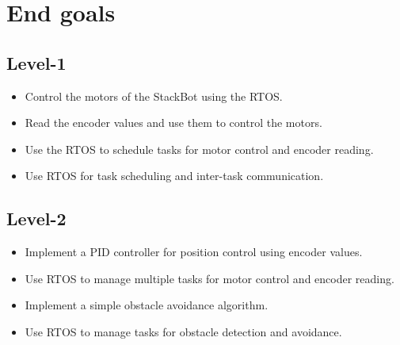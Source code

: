 \section*{End goals}

\subsection*{Level-1}

\begin{itemize}[noitemsep]
    \item Control the motors of the StackBot using the RTOS.\@
    \item Read the encoder values and use them to control the motors.
    \item Use the RTOS to schedule tasks for motor control and encoder reading.
    \item Use RTOS for task scheduling and inter-task communication.
\end{itemize}

\subsection*{Level-2}

\begin{itemize}[noitemsep]
    \item Implement a PID controller for position control using encoder values.
    \item Use RTOS to manage multiple tasks for motor control and encoder reading.
    \item Implement a simple obstacle avoidance algorithm.
    \item Use RTOS to manage tasks for obstacle detection and avoidance.
\end{itemize}
